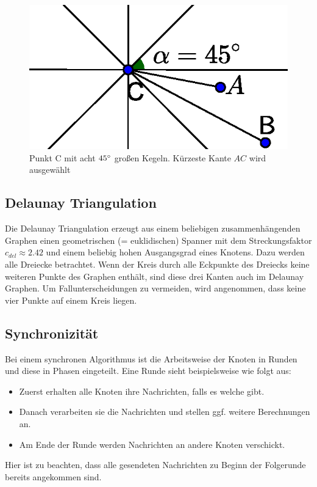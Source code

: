 \documentclass[a4paper,twoside]{IEEEtran}
\begin{document}
\begin{figure}
\centering
\includegraphics[width=0.99\linewidth]{Yao_Step2.eps}
\caption{Punkt C mit acht $45\degree $ großen Kegeln. Kürzeste Kante $AC $ wird ausgewählt}
\label{fig:YaoStep2}
\end{figure}



\subsection{Delaunay Triangulation}
Die Delaunay Triangulation erzeugt aus einem beliebigen zusammenhängenden Graphen einen geometrischen (= euklidischen) Spanner mit dem Streckungsfaktor $c_{del} \approx 2.42 $ und einem beliebig hohen Ausgangsgrad eines Knotens. 
Dazu werden alle Dreiecke betrachtet.
Wenn der Kreis durch alle Eckpunkte des Dreiecks keine weiteren Punkte des Graphen enthält, sind diese drei Kanten auch im Delaunay Graphen. 
Um Fallunterscheidungen zu vermeiden, wird angenommen, dass keine vier Punkte auf einem Kreis liegen. 



\subsection{Synchronizität}
Bei einem synchronen Algorithmus ist die Arbeitsweise der Knoten in Runden und diese in Phasen eingeteilt. 
Eine Runde sieht beispielsweise wie folgt aus:
\begin{itemize}
\item Zuerst erhalten alle Knoten ihre Nachrichten, falls es welche gibt.
\item Danach verarbeiten sie die Nachrichten und stellen ggf. weitere Berechnungen an.
\item Am Ende der Runde werden Nachrichten an andere Knoten verschickt.
\end{itemize}
Hier ist zu beachten, dass alle gesendeten Nachrichten zu Beginn der Folgerunde bereits angekommen sind.
\end{document}
